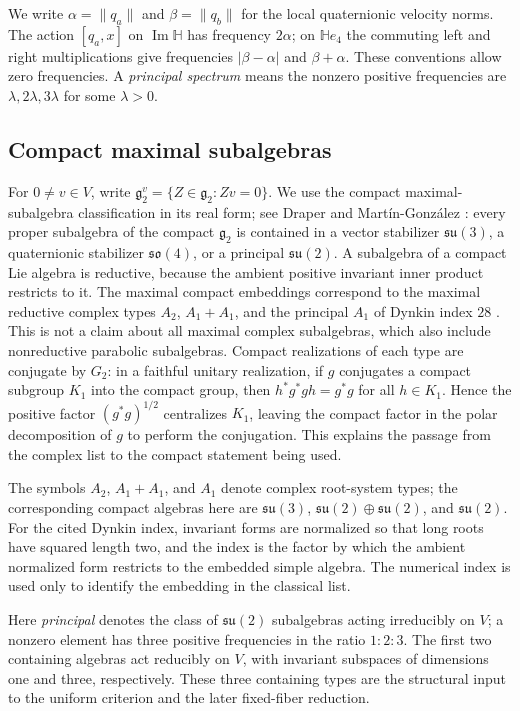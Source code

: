 \documentclass[11pt,a4paper]{article}
\newcommand{\HH}{\mathbb H}
\begin{document}
We write $\alpha=\|q_a\|$ and $\beta=\|q_b\|$ for the local quaternionic velocity norms.
The action $[q_a,x]$ on $\operatorname{Im}\HH$ has frequency $2\alpha$; on $\HH e_4$ the commuting left and right multiplications give frequencies $|\beta-\alpha|$ and $\beta+\alpha$.
These conventions allow zero frequencies.  A \emph{principal spectrum} means the nonzero positive frequencies are $\lambda,2\lambda,3\lambda$ for some $\lambda>0$.

\subsection{Compact maximal subalgebras}\label{subsec:compact-maximals}
For $0\ne v\in V$, write $\mathfrak g_2^v=\{Z\in\mathfrak g_2:Zv=0\}$.  We use the compact maximal-subalgebra classification in its real form; see Draper and Mart\'in-Gonz\'alez \cite{DraperMartin2025}: every proper subalgebra of the compact $\mathfrak g_2$ is contained in a vector stabilizer $\mathfrak{su}(3)$, a quaternionic stabilizer $\mathfrak{so}(4)$, or a principal $\mathfrak{su}(2)$.  A subalgebra of a compact Lie algebra is reductive, because the ambient positive invariant inner product restricts to it.  The maximal compact embeddings correspond to the maximal reductive complex types $A_2$, $A_1+A_1$, and the principal $A_1$ of Dynkin index $28$ \cite{Dynkin1952b}.  This is not a claim about all maximal complex subalgebras, which also include nonreductive parabolic subalgebras.  Compact realizations of each type are conjugate by $G_2$: in a faithful unitary realization, if $g$ conjugates a compact subgroup $K_1$ into the compact group, then $h^*g^*gh=g^*g$ for all $h\in K_1$.  Hence the positive factor $(g^*g)^{1/2}$ centralizes $K_1$, leaving the compact factor in the polar decomposition of $g$ to perform the conjugation.  This explains the passage from the complex list to the compact statement being used.

The symbols $A_2$, $A_1+A_1$, and $A_1$ denote complex root-system types; the corresponding compact algebras here are $\mathfrak{su}(3)$, $\mathfrak{su}(2)\oplus\mathfrak{su}(2)$, and $\mathfrak{su}(2)$.  For the cited Dynkin index, invariant forms are normalized so that long roots have squared length two, and the index is the factor by which the ambient normalized form restricts to the embedded simple algebra.  The numerical index is used only to identify the embedding in the classical list.

Here \emph{principal} denotes the class of $\mathfrak{su}(2)$ subalgebras acting irreducibly on $V$; a nonzero element has three positive frequencies in the ratio $1:2:3$.  The first two containing algebras act reducibly on $V$, with invariant subspaces of dimensions one and three, respectively.  These three containing types are the structural input to the uniform criterion and the later fixed-fiber reduction.
\end{document}
